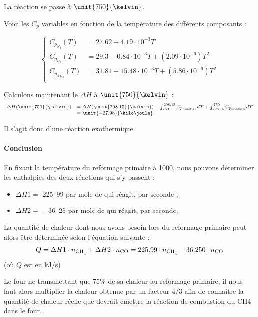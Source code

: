 La réaction se passe à $\unit{750}{\kelvin}$.
						
Voici les $C_p$ variables en fonction de la température des différents composants \cite{hc-table} :

$$
	\left\{
		\begin{array}{rl}
			C_{p_{N_2}}(T) 	&= 27.62 + 4.19\cdot10^{-3}T \\
			C_{p_{H_2}}(T)	&= 29.3 - 0.84\cdot10^{-3}T + (2.09\cdot10^{-6})T^2\\
			C_{p_{NH_3}}(T) 	&= 31.81 + 15.48\cdot10^{-3}T + (5.86\cdot10^{-6})T^2 \\
		\end{array}
	\right.
$$
					
Calculons maintenant le $\Delta H$ à $\unit{750}{\kelvin}$ :			
$$
	\begin{array}{rl}
		 	 \Delta H(\unit{750}{\kelvin})	&=  \Delta H(\unit{298.15}{\kelvin}) 
																							+ \int_{750}^{298.15} C_{p_{reactifs}} dT + \int_{298.15}^{750} C_{p_{produits}} dT \\
																				&=  \unit{-27.98}{\kilo\joule}
	\end{array}
$$	
	
Il s'agit donc d'une réaction exothermique.

\paragraph{Conclusion}
En fixant la température du reformage primaire à \unit{1000}{\kelvin}, nous pouvons déterminer les enthalpies des deux 
réactions qui s’y passent :
\begin{itemize}
	\item $\Delta H1 =$ \unit{225.99}{\kilo\joule} par mole de  qui réagit, par seconde ;
	\item $\Delta H2 =$ \unit{-36.25}{\kilo\joule} par mole de  qui réagit, par seconde.
\end{itemize}

La quantité de chaleur dont nous avons besoin lors du reformage primaire peut alors être déterminée selon l’équation suivante : 
$$Q = \Delta H1\cdot n_{\ce{CH4}} +\Delta H2\cdot n_{\ce{CO}} = 225.99\cdot n_{\ce{CH4}} - 36.250\cdot n_{\ce{CO}}$$
(où $Q$ est en kJ/s) 

Le four ne transmettant que 75\% de sa chaleur au reformage primaire, il nous faut alors multiplier la chaleur 
obtenue par un facteur 4/3 afin de connaître la quantité de chaleur réelle que devrait émettre la réaction de combustion 
du CH4 dans le four.


